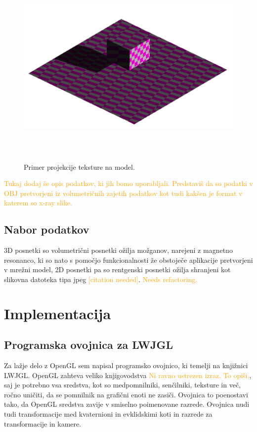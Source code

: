 \documentclass[a4paper, 12pt]{book}
\begin{document}
\begin{figure}[h]
\begin{center}
\includegraphics[width=12cm, height=10cm, keepaspectratio=true]{Tekstura_projecirana_na_model.png}
\end{center}
\caption{Primer projekcije teksture na model.}
\label{teksturaprojecirananamodel}
\end{figure}

\textcolor{orange}{Tukaj dodaj še opis podatkov, ki jih bomo uporabljali. Predstaviš da so podatki v OBJ pretvorjeni iz volumetričnih zajetih podatkov kot tudi kakšen je format v katerem so x-ray slike.}

\section{Nabor podatkov}
3D posnetki so volumetrični posnetki ožilja možganov, narejeni z magnetno resonanco, ki so nato s pomočjo funkcionalnosti že obstoječe aplikacije pretvorjeni v mrežni model, 2D posnetki pa so rentgenski posnetki ožilja shranjeni kot slikovna datoteka tipa jpeg \textcolor{orange}{[citation needed]}.
\textcolor{orange}{Needs refactoring.}
\chapter{Implementacija}
\section{Programska ovojnica za LWJGL}

Za lažje delo z OpenGL sem napisal programsko ovojnico, ki temelji na knjižnici LWJGL. OpenGL zahteva veliko knjigovodstva \textcolor{orange}{Ni ravno ustrezen izraz. To opiši.}, saj je potrebno vsa sredstva, kot so medpomnilniki, senčilniki, teksture in več, ročno uničiti, da se pomnilnik na grafični enoti ne zasiči. Ovojnica to poenostavi tako, da OpenGL sredstva zavije v smiselno poimenovane razrede. Ovojnica nudi tudi transformacije med kvaternioni in evklidskimi koti in razrede za transformacije in kamere.
\end{document}
